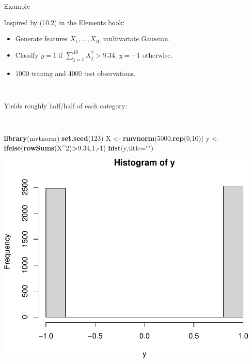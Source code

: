 \documentclass[
  10pt,
  ignorenonframetext,
]{beamer}
\newenvironment{Shaded}{\begin{snugshade}}{\end{snugshade}}
\newcommand{\AttributeTok}[1]{\textcolor[rgb]{0.13,0.29,0.53}{#1}}
\newcommand{\DecValTok}[1]{\textcolor[rgb]{0.00,0.00,0.81}{#1}}
\newcommand{\FloatTok}[1]{\textcolor[rgb]{0.00,0.00,0.81}{#1}}
\newcommand{\FunctionTok}[1]{\textcolor[rgb]{0.13,0.29,0.53}{\textbf{#1}}}
\newcommand{\NormalTok}[1]{#1}
\newcommand{\OtherTok}[1]{\textcolor[rgb]{0.56,0.35,0.01}{#1}}
\newcommand{\SpecialCharTok}[1]{\textcolor[rgb]{0.81,0.36,0.00}{\textbf{#1}}}
\newcommand{\StringTok}[1]{\textcolor[rgb]{0.31,0.60,0.02}{#1}}
\providecommand{\tightlist}{%
  \setlength{\itemsep}{0pt}\setlength{\parskip}{0pt}}
\begin{document}
\begin{frame}[fragile]
\begin{block}{Example}
\protect\hypertarget{example}{}
\(~\)

Inspired by (10.2) in the Elements book:

\vspace{2mm}

\begin{itemize}
\tightlist
\item
  Generate features \(X_1, \ldots, X_{10}\) multivariate Gaussian.
\item
  Classify \(y=1\) if \(\sum_{j=1}^{10}X_j^2 > 9.34\), \(y=-1\)
  otherwise.
\item
  1000 traning and 4000 test observations.
\end{itemize}

\(~\)

Yields roughly half/half of each category:

\(~\)

\scriptsize
\centering

\begin{Shaded}
\begin{Highlighting}[]
\FunctionTok{library}\NormalTok{(mvtnorm)}
\FunctionTok{set.seed}\NormalTok{(}\DecValTok{123}\NormalTok{)}
\NormalTok{X }\OtherTok{\textless{}{-}} \FunctionTok{rmvnorm}\NormalTok{(}\DecValTok{5000}\NormalTok{,}\FunctionTok{rep}\NormalTok{(}\DecValTok{0}\NormalTok{,}\DecValTok{10}\NormalTok{))}
\NormalTok{y }\OtherTok{\textless{}{-}} \FunctionTok{ifelse}\NormalTok{(}\FunctionTok{rowSums}\NormalTok{(X}\SpecialCharTok{\^{}}\DecValTok{2}\NormalTok{)}\SpecialCharTok{\textgreater{}}\FloatTok{9.34}\NormalTok{,}\DecValTok{1}\NormalTok{,}\SpecialCharTok{{-}}\DecValTok{1}\NormalTok{)}
\FunctionTok{hist}\NormalTok{(y,}\AttributeTok{title=}\StringTok{""}\NormalTok{)}
\end{Highlighting}
\end{Shaded}

\includegraphics[width=0.4\linewidth]{9TreeBost_files/figure-beamer/unnamed-chunk-1-1}
\end{block}
\end{frame}
\end{document}
